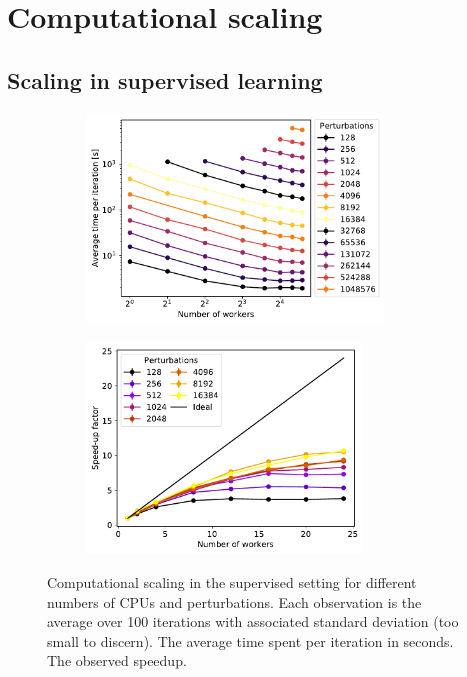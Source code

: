 
\section{Computational scaling}\label{sec: Experimental work: Computational scaling}

\subsection{Scaling in supervised learning}
\begin{figure}[tbp!]
    \begin{subfigure}[b]{0.517\textwidth}
        \centering
        \includegraphics[height=5.6cm]{graphics/E005-sca-analysis/E005-scaling-02.pdf}
        \caption{}
        \label{fig: Theory: E005-scaling-supervised-02}
    \end{subfigure}
    \hfill
    \begin{subfigure}[b]{0.473\textwidth}
        \centering
        \includegraphics[height=5.6cm]{graphics/E005-sca-analysis/E005-scaling-04.pdf}
        \caption{}
        \label{fig: Theory: E005-scaling-supervised-04}
    \end{subfigure}
    \caption{
        Computational scaling in the supervised setting for different numbers of \glspl{CPU} and perturbations. Each observation is the average over 100 iterations with associated standard deviation (too small to discern).
         The average time spent per iteration in seconds.
         The observed speedup.
    }
    \label{fig: Theory: E005-scaling-supervised}
\end{figure}
